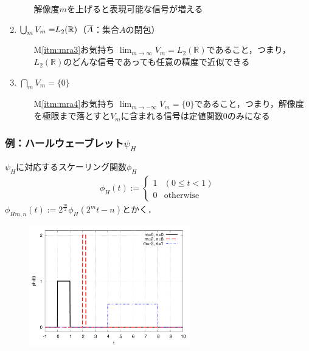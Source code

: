 \documentclass[dvipdfmx,graphicx,14pt]{beamer}
\newcommand{\roverline}[1]{\mathpalette\doroverline{#1}}
\newcommand{\doroverline}[2]{\overline{#1#2}}
\begin{document}
\begin{frame}[c, allowframebreaks]
\begin{enumerate}[(M1)]
\begin{itemize}
\begin{figure}
                    \end{figure}
                    解像度$m$を上げると表現可能な信号が増える
            \end{itemize}
            \newpage
        \item \label{itm:mra3} $\roverline{\bigcup_{m} V_{m}} = L_{2}(\mathbb{R})$（$\roverline{A}$：集合$A$の閉包）
            \begin{itemize}
                \item[M\ref{itm:mra3}お気持ち] $\displaystyle\lim_{m \to \infty} V_{m} = L_{2}(\mathbb{R})$であること，つまり，$L_{2}(\mathbb{R})$のどんな信号であっても任意の精度で近似できる
            \end{itemize}
        \item \label{itm:mra4} $\bigcap_{m} V_{m} = \{ 0 \}$
            \begin{itemize}
                \item[M\ref{itm:mra4}お気持ち] $\displaystyle\lim_{m \to -\infty} V_{m} = \{ 0 \}$であること，つまり，解像度を極限まで落とすと$V_{m}$に含まれる信号は定値関数$0$のみになる
            \end{itemize}
    \end{enumerate}
\end{frame}

\begin{frame}[c]
    \frametitle{例：ハールウェーブレット$\psi_{H}$}
    $\psi_{H}$に対応するスケーリング関数$\phi_{H}$
    \begin{align*}
        \phi_{H}(t) := 
        \left\{
           \begin{array}{cc}
               1  & (0 \leq t < 1) \\
               0  & \text{otherwise}
           \end{array}
        \right. 
    \end{align*}
    $\phi_{H m,n}(t) := 2^{\frac{m}{2}}\phi_{H}(2^{m}t - n)$とかく．
    \vspace*{-5pt}
    \begin{figure}
        \includegraphics[width=70mm]{./figs/haar_scaling_functions.pdf}
    \end{figure}
\end{frame}
\end{document}
